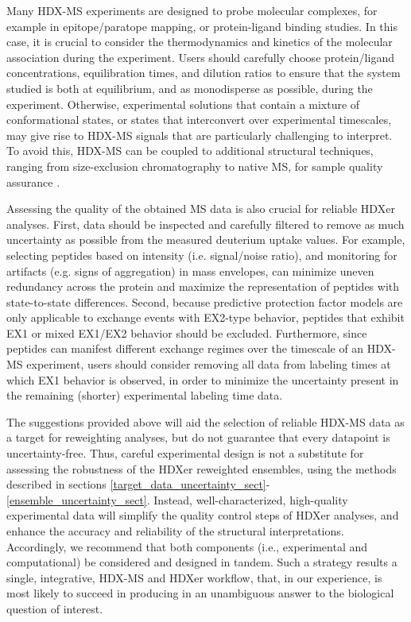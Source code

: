\documentclass[9pt,tutorial]{livecoms}
\begin{document}
Many HDX-MS experiments are designed to probe molecular complexes, for example in epitope/paratope mapping, or protein-ligand binding studies.
In this case, it is crucial to consider the thermodynamics and kinetics of the molecular association during the experiment.
Users should carefully choose protein/ligand concentrations, equilibration times, and dilution ratios to ensure that the system studied is both at equilibrium, and as monodisperse as possible, during the experiment.
Otherwise, experimental solutions that contain a mixture of conformational states, or states that interconvert over experimental timescales, may give rise to HDX-MS signals that are particularly challenging to interpret.
To avoid this, HDX-MS can be coupled to additional structural techniques, ranging from size-exclusion chromatography to native MS, for sample quality assurance \cite{Masson2019,OBrien2018}.

Assessing the quality of the obtained MS data is also crucial for reliable HDXer analyses.
First, data should be inspected and carefully filtered to remove as much uncertainty as possible from the measured deuterium uptake values.
For example, selecting peptides based on intensity (i.e. signal/noise ratio), and monitoring for artifacts (e.g. signs of aggregation) in mass envelopes, can minimize uneven redundancy across the protein and maximize the representation of peptides with state-to-state differences.
Second, because predictive protection factor models are only applicable to exchange events with EX2-type behavior, peptides that exhibit EX1 or mixed EX1/EX2 behavior should be excluded.
Furthermore, since peptides can manifest different exchange regimes over the timescale of an HDX-MS experiment, users should consider removing all data from labeling times at which EX1 behavior is observed, in order to minimize the uncertainty present in the remaining (shorter) experimental labeling time data.

The suggestions provided above will aid the selection of reliable HDX-MS data as a target for reweighting analyses, but do not guarantee that every datapoint is uncertainty-free.
Thus, careful experimental design is not a substitute for assessing the robustness of the HDXer reweighted ensembles, using the methods described in sections \ref{target_data_uncertainty_sect}-\ref{ensemble_uncertainty_sect}.
Instead, well-characterized, high-quality experimental data will simplify the quality control steps of HDXer analyses, and enhance the accuracy and reliability of the structural interpretations.
Accordingly, we recommend that both components (i.e., experimental and computational) be considered and designed in tandem.
Such a strategy results a single, integrative, HDX-MS and HDXer workflow, that, in our experience, is most likely to succeed in producing in an unambiguous answer to the biological question of interest.
\end{document}

